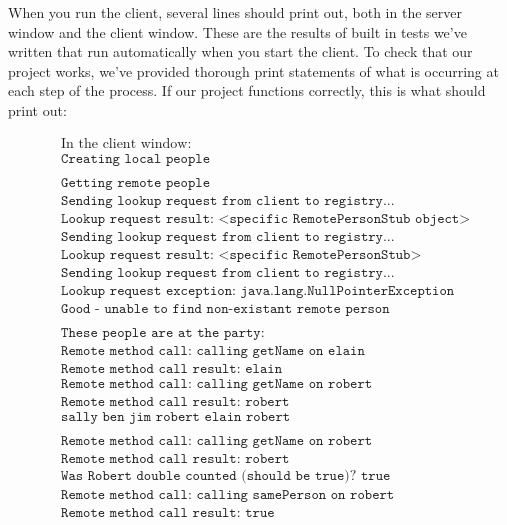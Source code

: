 \documentclass[12pt]{article}
\begin{document}
When you run the client, several lines should print out, both in the server window and the client window. These are the results of built in tests we've written that run automatically when you start the client. To check that our project works, we've provided thorough print statements of what is occurring at each step of the process. If our project functions correctly, this is what should print out:

\begin{align*}
	&\text{In the client window:} \\
	&\texttt{Creating local people} \\ \\
	&\texttt{Getting remote people} \\
	&\texttt{Sending lookup request from client to registry...} \\
	&\texttt{Lookup request result: <specific RemotePersonStub object>} \\
	&\texttt{Sending lookup request from client to registry...} \\
	&\texttt{Lookup request result: <specific RemotePersonStub>} \\
	&\texttt{Sending lookup request from client to registry...} \\
	&\texttt{Lookup request exception: java.lang.NullPointerException} \\
	&\texttt{Good - unable to find non-existant remote person} \\ \\
	&\texttt{These people are at the party:} \\
	&\texttt{Remote method call: calling getName on elain} \\
	&\texttt{Remote method call result: elain} \\
	&\texttt{Remote method call: calling getName on robert} \\
	&\texttt{Remote method call result: robert} \\
	&\texttt{sally ben jim robert elain robert} \\ \\
	&\texttt{Remote method call: calling getName on robert} \\
	&\texttt{Remote method call result: robert} \\
	&\texttt{Was Robert double counted (should be true)? true} \\
	&\texttt{Remote method call: calling samePerson on robert} \\
	&\texttt{Remote method call result: true} \\

\end{align*}
\end{document}
